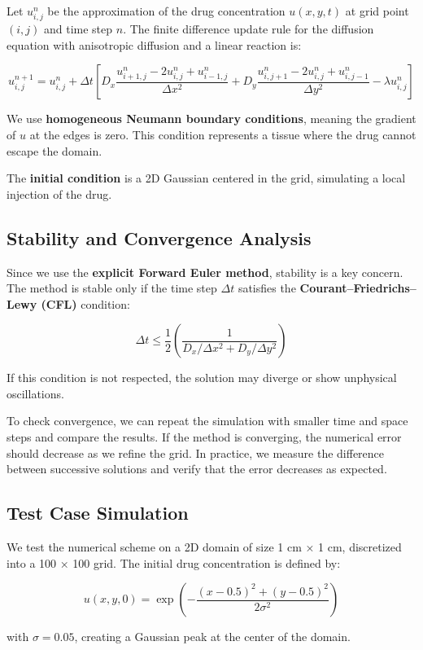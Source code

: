 \documentclass[11pt, a4paper]{article}
\begin{document}
Let \( u_{i,j}^n \) be the approximation of the drug concentration \( u(x, y, t) \) at grid point \( (i,j) \) and time step \( n \). The finite difference update rule for the diffusion equation with anisotropic diffusion and a linear reaction is:

\[
u_{i,j}^{n+1} = u_{i,j}^n + \Delta t \left[ D_x \frac{u_{i+1,j}^n - 2u_{i,j}^n + u_{i-1,j}^n}{\Delta x^2} + D_y \frac{u_{i,j+1}^n - 2u_{i,j}^n + u_{i,j-1}^n}{\Delta y^2} - \lambda u_{i,j}^n \right]
\]

We use \textbf{homogeneous Neumann boundary conditions}, meaning the gradient of \( u \) at the edges is zero. This condition represents a tissue where the drug cannot escape the domain.

The \textbf{initial condition} is a 2D Gaussian centered in the grid, simulating a local injection of the drug.

\subsection{Stability and Convergence Analysis}
Since we use the \textbf{explicit Forward Euler method}, stability is a key concern. The method is stable only if the time step \( \Delta t \) satisfies the \textbf{Courant–Friedrichs–Lewy (CFL)} condition:

\[
\Delta t \leq \frac{1}{2} \left( \frac{1}{D_x / \Delta x^2 + D_y / \Delta y^2} \right)
\]

If this condition is not respected, the solution may diverge or show unphysical oscillations.

To check convergence, we can repeat the simulation with smaller time and space steps and compare the results. If the method is converging, the numerical error should decrease as we refine the grid. In practice, we measure the difference between successive solutions and verify that the error decreases as expected.

\subsection{Test Case Simulation}
We test the numerical scheme on a 2D domain of size 1 cm × 1 cm, discretized into a 100 × 100 grid. The initial drug concentration is defined by:

\[
u(x, y, 0) = \exp\left( -\frac{(x - 0.5)^2 + (y - 0.5)^2}{2\sigma^2} \right)
\]

with \( \sigma = 0.05 \), creating a Gaussian peak at the center of the domain.
\end{document}
